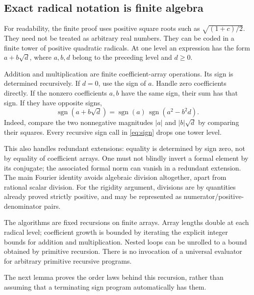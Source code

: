 \documentclass[11pt,a4paper]{article}
\theoremstyle{definition}
\newcommand{\sgn}{\operatorname{sgn}}
\begin{document}
\subsection{Exact radical notation is finite algebra}
For readability, the finite proof uses positive square roots such as
\(\sqrt{(1+c)/2}\). They need not be treated as arbitrary real numbers.
They can be coded in a finite tower of positive quadratic radicals.
At one level an expression has the form \(a+b\sqrt d\), where \(a,b,d\)
belong to the preceding level and \(d\ge0\).

Addition and multiplication are finite coefficient-array operations.
Its sign is determined recursively. If \(d=0\), use the sign of \(a\).
Handle zero coefficients directly. If the nonzero coefficients \(a,b\)
have the same sign, their sum has that sign. If they have opposite signs,
\[
 \sgn(a+b\sqrt d)
   =\sgn(a)\,\sgn(a^2-b^2d).
 \tag{2.3}\label{eq:sign}
\]
Indeed, compare the two nonnegative magnitudes
\(|a|\) and \(|b|\sqrt d\) by comparing their squares.
Every recursive sign call in \eqref{eq:sign} drops one tower level.

This also handles redundant extensions: equality is determined by
sign zero, not by equality of coefficient arrays. One must not blindly
invert a formal element by its conjugate; the associated formal norm
can vanish in a redundant extension. The main Fourier identity avoids
algebraic division altogether, apart from rational scalar division.
For the rigidity argument, divisions are by quantities already proved
strictly positive, and may be represented as numerator/positive-denominator
pairs.

The algorithms are fixed recursions on finite arrays. Array lengths
double at each radical level; coefficient growth is bounded by iterating
the explicit integer bounds for addition and multiplication.
Nested loops can be unrolled to a bound obtained by primitive recursion.
There is no invocation of a universal evaluator for arbitrary primitive
recursive programs.

The next lemma proves the order laws behind this recursion, rather than
assuming that a terminating sign program automatically has them.
\end{document}

